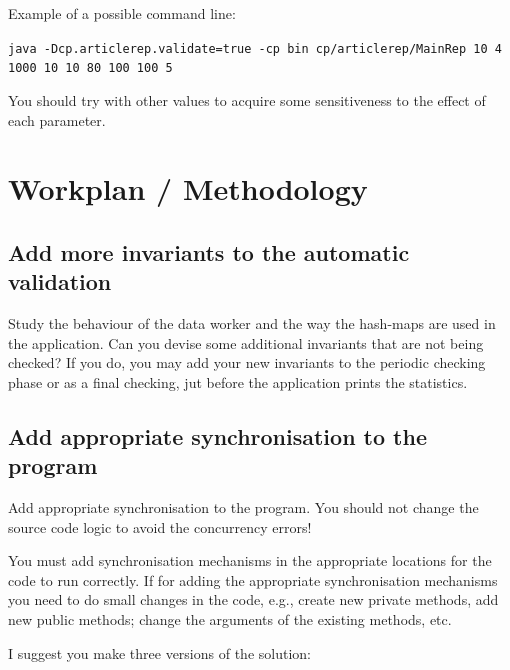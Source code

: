 \documentclass[a4paper,12pt]{article}
\begin{document}
Example of a possible command line:
\begin{flushleft}\footnotesize
\verb!java -Dcp.articlerep.validate=true -cp bin cp/articlerep/MainRep 10 4 1000 10 10 80 100 100 5!
\end{flushleft}

You should try with other values to acquire some sensitiveness to the effect of each parameter.



\section{Workplan / Methodology} %
\label{sec:mthodology}

\subsection{Add more invariants to the automatic validation} %
\label{ssub:1_add_more_invariants_to_the_automatic_validation}

Study the behaviour of the data worker and the way the hash-maps are used in the application. Can you devise some additional invariants that are not being checked? If you do, you may add your new invariants to the periodic checking phase or as a final checking, jut before the application prints the statistics.


\subsection{Add appropriate synchronisation to the program} %
\label{ssub:add_appropriate_synchronisation_to_the_program}

Add appropriate synchronisation to the program. You should not change the source code logic to avoid the concurrency errors!

You must add synchronisation mechanisms in the appropriate locations for the code to run correctly.  If for adding the appropriate synchronisation mechanisms you need to do small changes in the code, e.g., create new private methods, add new public methods; change the arguments of the existing methods, etc.

I suggest you make three versions of the solution:
\end{document}
